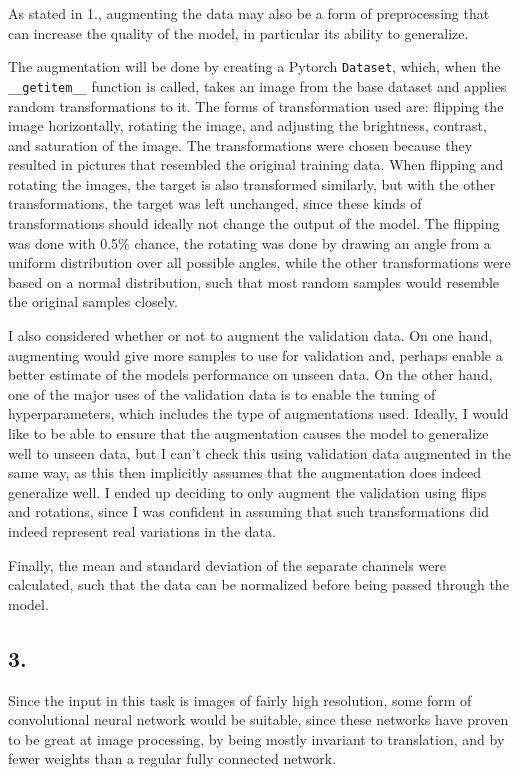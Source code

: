 \documentclass[a4paper, 12pt]{article}
\begin{document}
As stated in 1., augmenting the data may also be a form of preprocessing that can increase the quality of the model, in particular its ability to generalize. 

The augmentation will be done by creating a Pytorch \texttt{Dataset}, which, when the \texttt{\_\_getitem\_\_} function is called, takes an image from the base dataset and applies random transformations to it. The forms of transformation used are: flipping the image horizontally, rotating the image, and adjusting the brightness, contrast, and saturation of the image. The transformations were chosen because they resulted in pictures that resembled the original training data. When flipping and rotating the images, the target is also transformed similarly, but with the other transformations, the target was left unchanged, since these kinds of transformations should ideally not change the output of the model. The flipping was done with 0.5\% chance, the rotating was done by drawing an angle from a uniform distribution over all possible angles, while the other transformations were based on a normal distribution, such that most random samples would resemble the original samples closely.

I also considered whether or not to augment the validation data. On one hand, augmenting would give more samples to use for validation and, perhaps enable a better estimate of the models performance on unseen data. On the other hand, one of the major uses of the validation data is to enable the tuning of hyperparameters, which includes the type of augmentations used. Ideally, I would like to be able to ensure that the augmentation causes the model to generalize well to unseen data, but I can't check this using validation data augmented in the same way, as this then implicitly assumes that the augmentation does indeed generalize well. I ended up deciding to only augment the validation using flips and rotations, since I was confident in assuming that such transformations did indeed represent real variations in the data.

Finally, the mean and standard deviation of the separate channels were calculated, such that the data can be normalized before being passed through the model.

\subsection{3.}

Since the input in this task is images of fairly high resolution, some form of convolutional neural network would be suitable, since these networks have proven to be great at image processing, by being mostly invariant to translation, and by fewer weights than a regular fully connected network.
\end{document}
